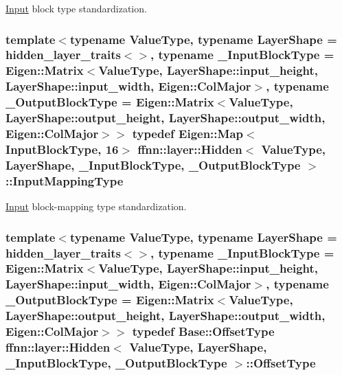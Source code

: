 \hyperlink{classffnn_1_1layer_1_1_input}{Input} block type standardization. 

\hypertarget{classffnn_1_1layer_1_1_hidden_a9297d5b8ac45dc288ee1b91f15bb4047}{
\subsubsection[{Input\-Mapping\-Type}]{\setlength{\rightskip}{0pt plus 5cm}template$<$typename Value\-Type, typename Layer\-Shape = hidden\-\_\-layer\-\_\-traits$<$$>$, typename \-\_\-\-Input\-Block\-Type = Eigen\-::\-Matrix$<$\-Value\-Type, Layer\-Shape\-::input\-\_\-height,  Layer\-Shape\-::input\-\_\-width,  Eigen\-::\-Col\-Major$>$, typename \-\_\-\-Output\-Block\-Type = Eigen\-::\-Matrix$<$\-Value\-Type, Layer\-Shape\-::output\-\_\-height, Layer\-Shape\-::output\-\_\-width, Eigen\-::\-Col\-Major$>$$>$ typedef Eigen\-::\-Map$<${\bf Input\-Block\-Type}, 16$>$ {\bf ffnn\-::layer\-::\-Hidden}$<$ Value\-Type, Layer\-Shape, \-\_\-\-Input\-Block\-Type, \-\_\-\-Output\-Block\-Type $>$\-::{\bf Input\-Mapping\-Type}}}\label{classffnn_1_1layer_1_1_hidden_a9297d5b8ac45dc288ee1b91f15bb4047}


\hyperlink{classffnn_1_1layer_1_1_input}{Input} block-\/mapping type standardization. 

\hypertarget{classffnn_1_1layer_1_1_hidden_ae2409b970adafb0ebc9b2eec62c4aac4}{
\subsubsection[{Offset\-Type}]{\setlength{\rightskip}{0pt plus 5cm}template$<$typename Value\-Type, typename Layer\-Shape = hidden\-\_\-layer\-\_\-traits$<$$>$, typename \-\_\-\-Input\-Block\-Type = Eigen\-::\-Matrix$<$\-Value\-Type, Layer\-Shape\-::input\-\_\-height,  Layer\-Shape\-::input\-\_\-width,  Eigen\-::\-Col\-Major$>$, typename \-\_\-\-Output\-Block\-Type = Eigen\-::\-Matrix$<$\-Value\-Type, Layer\-Shape\-::output\-\_\-height, Layer\-Shape\-::output\-\_\-width, Eigen\-::\-Col\-Major$>$$>$ typedef {\bf Base\-::\-Offset\-Type} {\bf ffnn\-::layer\-::\-Hidden}$<$ Value\-Type, Layer\-Shape, \-\_\-\-Input\-Block\-Type, \-\_\-\-Output\-Block\-Type $>$\-::{\bf Offset\-Type}}}\label{classffnn_1_1layer_1_1_hidden_ae2409b970adafb0ebc9b2eec62c4aac4}


